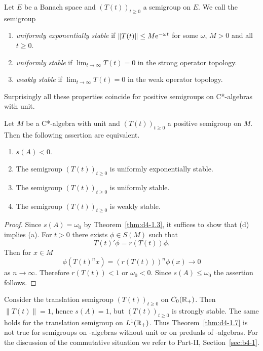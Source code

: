 \begin{definition}\label{def:d4-1.6}
Let $E$ be a Banach space and $(T(t))_{t \geq 0}$ a semigroup on $E$.
We call the semigroup
\begin{enumerate}[\upshape (i)]
\item 
\emph{uniformly exponentially stable} if\/ $\|T(t)\| \leq M\eu^{-\omega t}$ for some $\omega$, $M > 0$ and all $t \geq 0$.

\item 
\emph{uniformly stable} if\/ $\lim_{t \to \infty} T(t) = 0$ in the strong operator topology.

\item 
\emph{weakly stable} if\/ $\lim_{t \to \infty} T(t) = 0$ in the weak operator topology.
\end{enumerate}
\end{definition}
Surprisingly all these properties coincide for positive semigroups on C*-algebras with unit.
\begin{theorem}\label{thm:d4-1.7}
Let $M$ be a C*-algebra with unit and $(T(t))_{t \geq 0}$ a positive semigroup on $M$.
Then the following assertion are equivalent.
\begin{enumerate}[\upshape (a)]
\item 
$s(A) < 0$.

\item 
The semigroup $(T(t))_{t \geq 0}$ is uniformly exponentially stable.

\item 
The semigroup $(T(t))_{t \geq 0}$ is uniformly stable.

\item 
The semigroup $(T(t))_{t \geq 0}$ is weakly stable.

\end{enumerate}
\end{theorem}
\begin{proof}
Since $s(A) = \omega_{0}$ by Theorem~\ref{thm:d4-1.3}, it suffices to show that (d) implies (a).
For $t > 0$ there exists $\phi \in S(M)$ such that
\[
    T(t)'\phi = r(T(t))\phi .
\]
Then for $x \in M$
\[
    \phi(T(t)^{n}x) = (r(T(t)))^{n} \phi(x) \to 0
\]
as $n \to \infty$.
Therefore $r(T(t)) < 1$ or $\omega_{0} < 0$.
Since $s(A) \leq \omega_{0}$ the assertion follows.
\end{proof}
\begin{remark}\label{rem:d4-1.8}
Consider the translation semigroup $(T(t))_{t \geq 0}$ on $C_{0}(\mathbb{R}_{+})$. 
Then {$\|T(t)\| = 1$}, hence $s(A) = 1$, but $(T(t))_{t \geq 0}$ is strongly stable.
The same holds for the translation semigroup on $L^1(\mathbb{R}_{+})$.
Thus Theorem~\ref{thm:d4-1.7} is not true for semigroups on \CA-algebras without unit or on preduals of \WA-algebras.
For the discussion of the commutative situation we refer to Part-II, Section~\ref{sec:b4-1}.
\end{remark}
